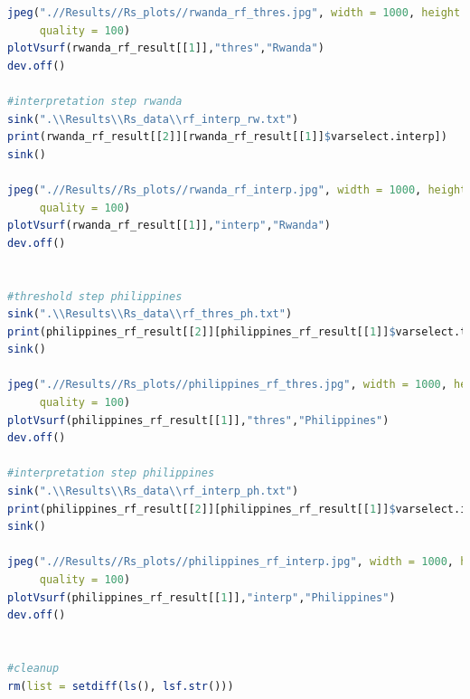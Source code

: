 \documentclass[11pt]{article}
\begin{document}
\begin{lstlisting}[language= R]
jpeg(".//Results//Rs_plots//rwanda_rf_thres.jpg", width = 1000, height = 700, units = "px", pointsize = 20,
     quality = 100)
plotVsurf(rwanda_rf_result[[1]],"thres","Rwanda")
dev.off()

#interpretation step rwanda
sink(".\\Results\\Rs_data\\rf_interp_rw.txt")
print(rwanda_rf_result[[2]][rwanda_rf_result[[1]]$varselect.interp])
sink()

jpeg(".//Results//Rs_plots//rwanda_rf_interp.jpg", width = 1000, height = 700, units = "px", pointsize = 20,
     quality = 100)
plotVsurf(rwanda_rf_result[[1]],"interp","Rwanda")
dev.off()


#threshold step philippines
sink(".\\Results\\Rs_data\\rf_thres_ph.txt")
print(philippines_rf_result[[2]][philippines_rf_result[[1]]$varselect.thres])
sink() 

jpeg(".//Results//Rs_plots//philippines_rf_thres.jpg", width = 1000, height = 700, units = "px", pointsize = 20,
     quality = 100)
plotVsurf(philippines_rf_result[[1]],"thres","Philippines")
dev.off()

#interpretation step philippines
sink(".\\Results\\Rs_data\\rf_interp_ph.txt")
print(philippines_rf_result[[2]][philippines_rf_result[[1]]$varselect.interp])
sink()

jpeg(".//Results//Rs_plots//philippines_rf_interp.jpg", width = 1000, height = 700, units = "px", pointsize = 20,
     quality = 100)
plotVsurf(philippines_rf_result[[1]],"interp","Philippines")
dev.off()


#cleanup
rm(list = setdiff(ls(), lsf.str()))
\end{lstlisting}
\end{document}

